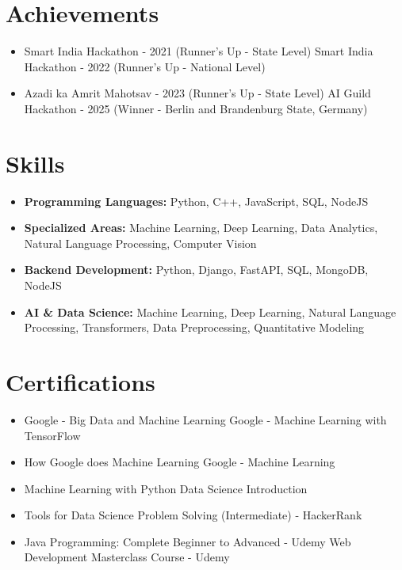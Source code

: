 \documentclass[a4paper,10pt]{article}
\begin{document}
\section*{Achievements}
\begin{itemize}
\item Smart India Hackathon - 2021 (Runner's Up - State Level) \hfill Smart India Hackathon - 2022 (Runner's Up - National Level)
\item Azadi ka Amrit Mahotsav - 2023 (Runner's Up - State Level) \hfill AI Guild Hackathon - 2025 (Winner - Berlin and Brandenburg State, Germany)
\end{itemize}

\section*{Skills}
\begin{itemize}
  \item \textbf{Programming Languages:} Python, C++, JavaScript, SQL, NodeJS
  \item \textbf{Specialized Areas:} Machine Learning, Deep Learning, Data Analytics, Natural Language Processing, Computer Vision
  \item \textbf{Backend Development:} Python, Django, FastAPI, SQL, MongoDB, NodeJS
  \item \textbf{AI \& Data Science:} Machine Learning, Deep Learning, Natural Language Processing, Transformers, Data Preprocessing, Quantitative Modeling
\end{itemize}

\section*{Certifications}
\begin{itemize}
\item Google - Big Data and Machine Learning \hfill Google - Machine Learning with TensorFlow
\item How Google does Machine Learning \hfill Google - Machine Learning
\item Machine Learning with Python \hfill Data Science Introduction
\item Tools for Data Science \hfill Problem Solving (Intermediate) - HackerRank
\item Java Programming: Complete Beginner to Advanced - Udemy \hfill Web Development Masterclass Course - Udemy
\end{itemize}
\end{document}
